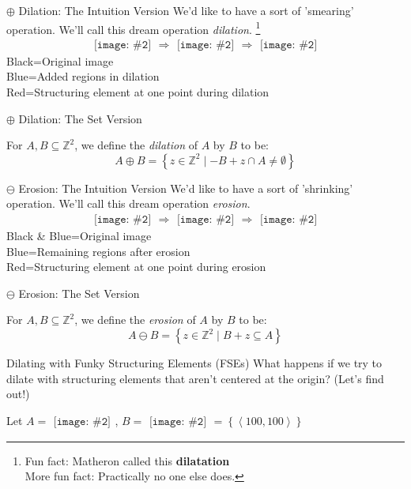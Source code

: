 \documentclass{beamer}
\newcommand{\pic}[2]{
     \begin{array}{l}
      \texttt{[image: \#2]}
      \end{array}
}
\newcommand{\set}[1]{\left\lbrace #1 \right\rbrace}
\newcommand{\buildset}[2]{\set{#1 \mid #2}}
\newcommand{\tuple}[1]{\left\langle #1 \right\rangle}
\newcommand{\intersect}{\cap}
\newcommand{\integers}{\mathbb{Z}}
\newcommand{\dilate}{\oplus}
\newcommand{\erode}{\ominus}
\begin{document}
\begin{frame}{$\dilate$ Dilation: The Intuition Version}
  We'd like to have a sort of 'smearing' operation. 
  We'll call this dream operation \emph{dilation}.
  \footnote{Fun fact: Matheron called this \textbf{dilatation}\\
            More fun fact: Practically no one else does.}
    $$\pic{width=75pt}{images/box}\Rightarrow
      \pic{width=75pt}{images/dilation_example.png}\Rightarrow
      \pic{width=75pt}{images/dilatedbox.png}$$
      Black=Original image\\
      Blue=Added regions in dilation\\
      Red=Structuring element at one point during dilation
\end{frame}

\begin{frame}{$\dilate$ Dilation: The Set Version}
  \begin{definition}
    For $A,B \subseteq \integers^2$, we define the \emph{dilation} of $A$ by $B$
    to be:
    $$A \dilate B = \buildset{z \in \mathbb{Z}^2}
                             {-B+z \intersect A \not= \emptyset}$$
  \end{definition}
  
\end{frame}
\begin{frame}{$\erode$ Erosion: The Intuition Version}
  We'd like to have a sort of 'shrinking' operation. 
  We'll call this dream operation \emph{erosion}.
    $$\pic{width=75pt}{images/box.png}\Rightarrow
      \pic{width=75pt}{images/erosion_example.png}\Rightarrow
      \pic{width=75pt}{images/erodedbox.png}$$
      Black \& Blue=Original image\\
       Blue=Remaining regions after erosion\\
       Red=Structuring element at one point during erosion
 
\end{frame}

\begin{frame}{$\erode$ Erosion: The Set Version}
   \begin{definition}
    For $A,B \subseteq \integers^2$, we define the \emph{erosion} of 
    $A$ by $B$ to be:
    $$A \erode B=\buildset{z \in \mathbb{Z}^2}{B+z \subseteq A}$$
  \end{definition}
 
\end{frame}
\begin{frame}{Dilating with Funky Structuring Elements (FSEs)}
  What happens if we try to dilate with structuring elements that aren't
  centered at the origin? (Let's find out!)

  Let $A = \pic{width=50pt}{images/binarycoolhamblen.png}$,
      $B = \pic{width=50pt}{images/fse.png}=
           \set{\tuple{100,100}}$

\end{frame}
\end{document}
